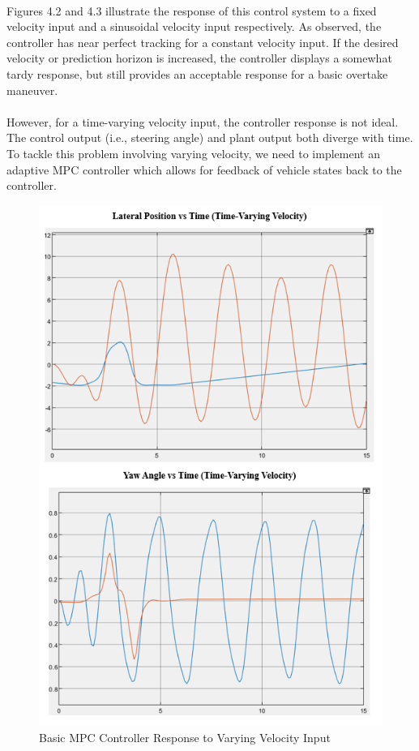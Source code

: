 \paragraph{}
Figures 4.2 and 4.3 illustrate the response of this control system to a fixed velocity input and a sinusoidal velocity input respectively. As observed, the controller has near perfect tracking for a constant velocity input. If the desired velocity or prediction horizon is increased, the controller displays a somewhat tardy response, but still provides an acceptable response for a basic overtake maneuver. 

\paragraph{}
However, for a time-varying velocity input, the controller response is not ideal. The control output (i.e., steering angle) and plant output both diverge with time. To tackle this problem involving varying velocity, we need to implement an adaptive MPC controller which allows for feedback of vehicle states back to the controller.

\begin{figure}[H]\label{fig4.3}
\centering \includegraphics[scale=1.1]{Images/basic_mpc_varying_response.png}
\caption{Basic MPC Controller Response to Varying Velocity Input}
\end{figure}

